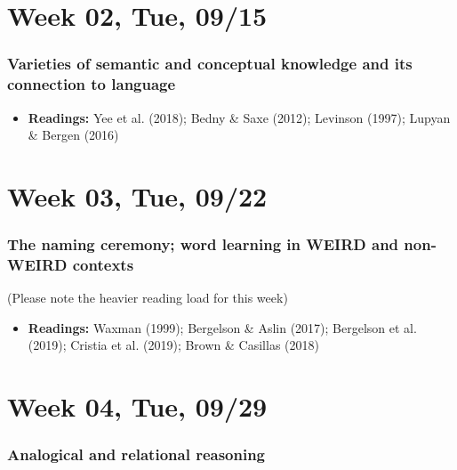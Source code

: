 \documentclass[11pt,man]{article}
\providecommand{\tightlist}{%
  \setlength{\itemsep}{0pt}\setlength{\parskip}{0pt}}
\begin{document}
\hypertarget{week-02-tue-0915}{%
\section{Week 02, Tue, 09/15}\label{week-02-tue-0915}}

\hypertarget{varieties-of-semantic-and-conceptual-knowledge-and-its-connection-to-language}{%
\subsubsection{Varieties of semantic and conceptual knowledge and its
connection to
language}\label{varieties-of-semantic-and-conceptual-knowledge-and-its-connection-to-language}}

\begin{itemize}
\tightlist
\item
  \textbf{Readings:} Yee et al. (2018); Bedny \& Saxe (2012); Levinson
  (1997); Lupyan \& Bergen (2016)
\end{itemize}

\hypertarget{week-03-tue-0922}{%
\section{Week 03, Tue, 09/22}\label{week-03-tue-0922}}

\hypertarget{the-naming-ceremony-word-learning-in-weird-and-non-weird-contexts}{%
\subsubsection{The naming ceremony; word learning in WEIRD and non-WEIRD
contexts}\label{the-naming-ceremony-word-learning-in-weird-and-non-weird-contexts}}

(Please note the heavier reading load for this week)

\begin{itemize}
\tightlist
\item
  \textbf{Readings:} Waxman (1999); Bergelson \& Aslin (2017); Bergelson
  et al. (2019); Cristia et al. (2019); Brown \& Casillas (2018)
\end{itemize}

\hypertarget{week-04-tue-0929}{%
\section{Week 04, Tue, 09/29}\label{week-04-tue-0929}}

\hypertarget{analogical-and-relational-reasoning}{%
\subsubsection{Analogical and relational
reasoning}\label{analogical-and-relational-reasoning}}
\end{document}
